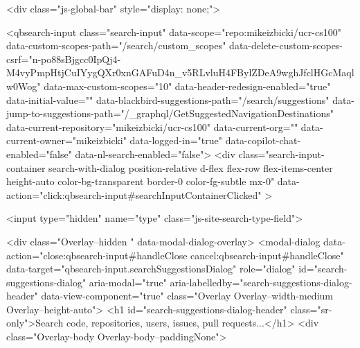       <div class="js-global-bar" style="display: none;">
        


<qbsearch-input class="search-input" data-scope="repo:mikeizbicki/ucr-cs100" data-custom-scopes-path="/search/custom_scopes" data-delete-custom-scopes-csrf="n-po88sBjgcc0IpQj4-M4vyPmpHtjCuIYygQXr0xnGAFuD4n_v5RLvluH4FBylZDeA9wghJfclHGcMaqlw0Wog" data-max-custom-scopes="10" data-header-redesign-enabled="true" data-initial-value="" data-blackbird-suggestions-path="/search/suggestions" data-jump-to-suggestions-path="/_graphql/GetSuggestedNavigationDestinations" data-current-repository="mikeizbicki/ucr-cs100" data-current-org="" data-current-owner="mikeizbicki" data-logged-in="true" data-copilot-chat-enabled="false" data-nl-search-enabled="false">
  <div
    class="search-input-container search-with-dialog position-relative d-flex flex-row flex-items-center height-auto color-bg-transparent border-0 color-fg-subtle mx-0"
    data-action="click:qbsearch-input#searchInputContainerClicked"
  >

    <input type="hidden" name="type" class="js-site-search-type-field">

    
<div class="Overlay--hidden " data-modal-dialog-overlay>
  <modal-dialog data-action="close:qbsearch-input#handleClose cancel:qbsearch-input#handleClose" data-target="qbsearch-input.searchSuggestionsDialog" role="dialog" id="search-suggestions-dialog" aria-modal="true" aria-labelledby="search-suggestions-dialog-header" data-view-component="true" class="Overlay Overlay--width-medium Overlay--height-auto">
      <h1 id="search-suggestions-dialog-header" class="sr-only">Search code, repositories, users, issues, pull requests...</h1>
    <div class="Overlay-body Overlay-body--paddingNone">
      

